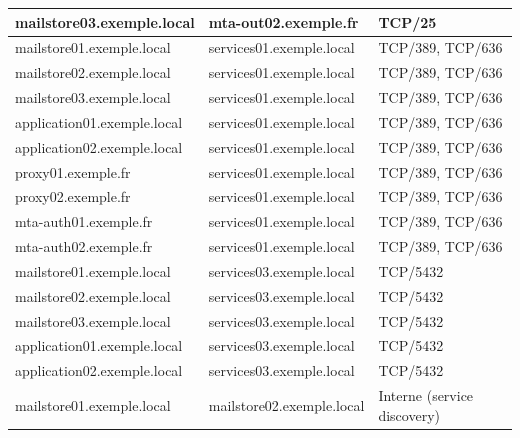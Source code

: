 \documentclass[11pt,a4paper]{report}
\begin{document}
\begin{longtable}{|p{5cm}|p{5cm}|p{5cm}|}
\hline
mailstore03.\allowbreak{}exemple.\allowbreak{}local & mta-\allowbreak{}out02.\allowbreak{}exemple.\allowbreak{}fr & TCP/25 \\
\hline
mailstore01.\allowbreak{}exemple.\allowbreak{}local & services01.\allowbreak{}exemple.\allowbreak{}local & TCP/389, TCP/636 \\
\hline
mailstore02.\allowbreak{}exemple.\allowbreak{}local & services01.\allowbreak{}exemple.\allowbreak{}local & TCP/389, TCP/636 \\
\hline
mailstore03.\allowbreak{}exemple.\allowbreak{}local & services01.\allowbreak{}exemple.\allowbreak{}local & TCP/389, TCP/636 \\
\hline
application01.\allowbreak{}exemple.\allowbreak{}local & services01.\allowbreak{}exemple.\allowbreak{}local & TCP/389, TCP/636 \\
\hline
application02.\allowbreak{}exemple.\allowbreak{}local & services01.\allowbreak{}exemple.\allowbreak{}local & TCP/389, TCP/636 \\
\hline
proxy01.\allowbreak{}exemple.\allowbreak{}fr & services01.\allowbreak{}exemple.\allowbreak{}local & TCP/389, TCP/636 \\
\hline
proxy02.\allowbreak{}exemple.\allowbreak{}fr & services01.\allowbreak{}exemple.\allowbreak{}local & TCP/389, TCP/636 \\
\hline
mta-\allowbreak{}auth01.\allowbreak{}exemple.\allowbreak{}fr & services01.\allowbreak{}exemple.\allowbreak{}local & TCP/389, TCP/636 \\
\hline
mta-\allowbreak{}auth02.\allowbreak{}exemple.\allowbreak{}fr & services01.\allowbreak{}exemple.\allowbreak{}local & TCP/389, TCP/636 \\
\hline
mailstore01.\allowbreak{}exemple.\allowbreak{}local & services03.\allowbreak{}exemple.\allowbreak{}local & TCP/5432 \\
\hline
mailstore02.\allowbreak{}exemple.\allowbreak{}local & services03.\allowbreak{}exemple.\allowbreak{}local & TCP/5432 \\
\hline
mailstore03.\allowbreak{}exemple.\allowbreak{}local & services03.\allowbreak{}exemple.\allowbreak{}local & TCP/5432 \\
\hline
application01.\allowbreak{}exemple.\allowbreak{}local & services03.\allowbreak{}exemple.\allowbreak{}local & TCP/5432 \\
\hline
application02.\allowbreak{}exemple.\allowbreak{}local & services03.\allowbreak{}exemple.\allowbreak{}local & TCP/5432 \\
\hline
mailstore01.\allowbreak{}exemple.\allowbreak{}local & mailstore02.\allowbreak{}exemple.\allowbreak{}local & Interne (service discovery) \\

\end{longtable}
\end{document}
